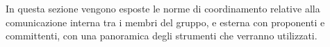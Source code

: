  In questa sezione vengono esposte le norme di coordinamento relative alla comunicazione interna tra i membri del gruppo, e esterna con proponenti e committenti, con una panoramica degli strumenti che verranno utilizzati.